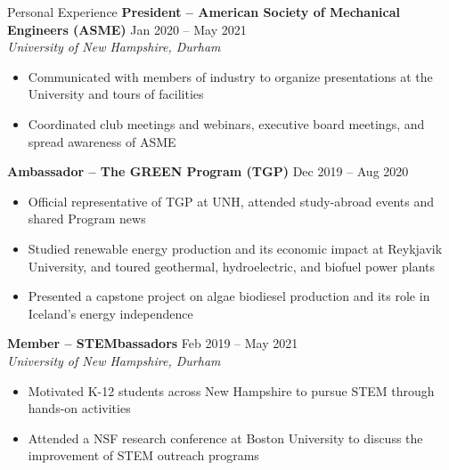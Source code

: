 \documentclass{resume}
\begin{document}
\begin{rSection}{Personal Experience}
    {\textbf{President -- American Society of Mechanical Engineers (ASME)}} \hfill {Jan 2020 -- May 2021}
    \\ {\em University of New Hampshire, Durham}
    \vspace{-0.5em}
    \begin{itemize}[label={\tiny\raisebox{1ex}{\textbullet}}, noitemsep]
        \item Communicated with members of industry to organize presentations at the University and tours of facilities
        \item Coordinated club meetings and webinars, executive board meetings, and spread awareness of ASME
    \end{itemize}
    \vspace{-0.4em}
    {\textbf{Ambassador -- The GREEN Program (TGP)}} \hfill {Dec 2019 -- Aug 2020}
    \vspace{-0.5em}
    \begin{itemize}[label={\tiny\raisebox{1ex}{\textbullet}}, noitemsep]
        \item Official representative of TGP at UNH, attended study-abroad events and shared Program news
        \item Studied renewable energy production and its economic impact at Reykjavik University, and toured geothermal, hydroelectric, and biofuel power plants
        \item Presented a capstone project on algae biodiesel production and its role in Iceland's energy independence
    \end{itemize}
    \vspace{-0.4em}
    {\textbf{Member -- STEMbassadors}} \hfill {{Feb 2019 -- May 2021}}
    \\ {\em University of New Hampshire, Durham}
    \vspace{-0.5em}
    \begin{itemize}[label={\tiny\raisebox{1ex}{\textbullet}}, noitemsep]
        \item Motivated K-12 students across New Hampshire to pursue STEM through hands-on activities
        \item Attended a NSF research conference at Boston University to discuss the improvement of STEM outreach programs
    \end{itemize}
\end{rSection}
\end{document}
